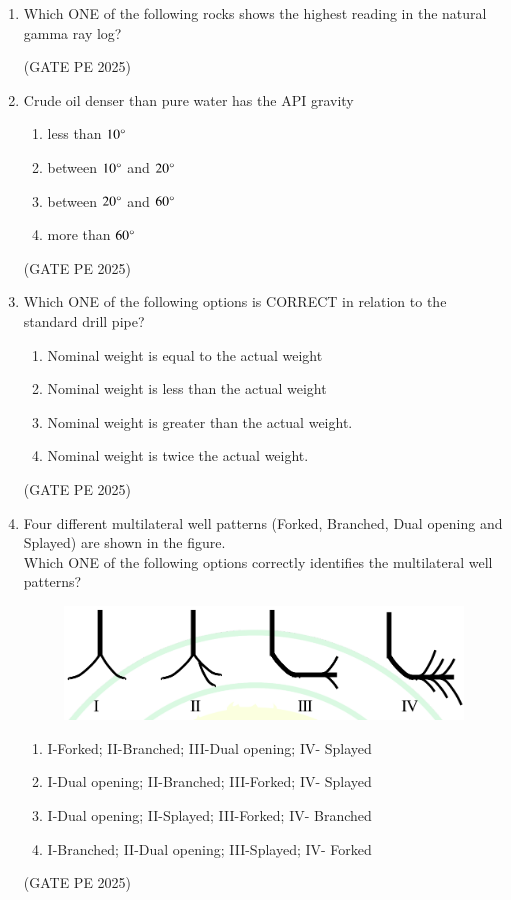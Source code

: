\documentclass[journal,12pt,onecolumn]{IEEEtran}
\theoremstyle{remark}
\begin{document}
\begin{enumerate}
\item Which ONE of the following rocks shows the highest reading in the natural gamma ray log?
\begin{enumerate}
\end{enumerate}
\hfill{(GATE PE 2025)}

\item Crude oil denser than pure water has the API gravity
\begin{enumerate}
    \item less than $10\degree$
    \item between $10\degree$ and $20\degree$
    \item between $20\degree$ and $60\degree$
    \item more than $60\degree$
\end{enumerate}
\hfill{(GATE PE 2025)}

\item Which ONE of the following options is CORRECT in relation to the standard drill pipe?
\begin{enumerate}
    \item Nominal weight is equal to the actual weight
    \item Nominal weight is less than the actual weight
    \item Nominal weight is greater than the actual weight.
    \item Nominal weight is twice the actual weight.
\end{enumerate}
\hfill{(GATE PE 2025)}

\item Four different multilateral well patterns (Forked, Branched, Dual opening and Splayed) are shown in the figure.\\
Which ONE of the following options correctly identifies the multilateral well patterns?
\begin{figure}[H]
    \centering
    \includegraphics[width=0.4\columnwidth]{25Q24.png}
    \caption{}
    \label{fig:placeholder}
\end{figure}
\begin{enumerate}
    \item I-Forked; II-Branched; III-Dual opening; IV- Splayed
    \item I-Dual opening; II-Branched; III-Forked; IV- Splayed
    \item I-Dual opening; II-Splayed; III-Forked; IV- Branched
    \item I-Branched; II-Dual opening; III-Splayed; IV- Forked
\end{enumerate}
\hfill{(GATE PE 2025)}


\end{enumerate}
\end{document}

